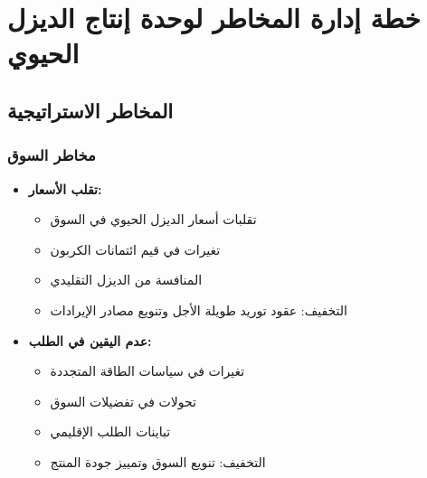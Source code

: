 \section{خطة إدارة المخاطر لوحدة إنتاج الديزل الحيوي}

\subsection{المخاطر الاستراتيجية}

\subsubsection{مخاطر السوق}
\begin{itemize}
    \item \textbf{تقلب الأسعار:}
    \begin{itemize}
        \item تقلبات أسعار الديزل الحيوي في السوق
        \item تغيرات في قيم ائتمانات الكربون
        \item المنافسة من الديزل التقليدي
        \item التخفيف: عقود توريد طويلة الأجل وتنويع مصادر الإيرادات
    \end{itemize}
    
    \item \textbf{عدم اليقين في الطلب:}
    \begin{itemize}
        \item تغيرات في سياسات الطاقة المتجددة
        \item تحولات في تفضيلات السوق
        \item تباينات الطلب الإقليمي
        \item التخفيف: تنويع السوق وتمييز جودة المنتج
    \end{itemize}
\end{itemize}

